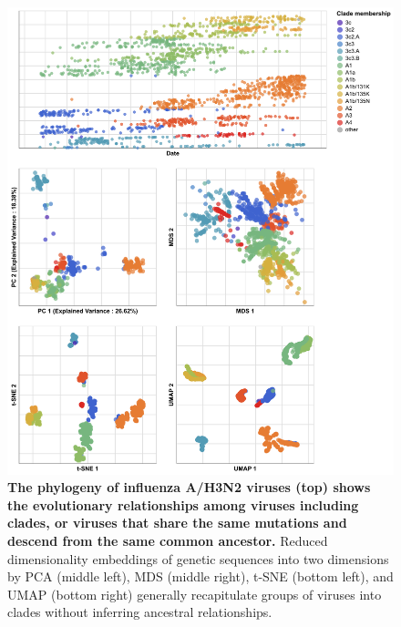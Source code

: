 \documentclass[10pt,letterpaper]{article}
\begin{document}

\begin{figure}[!h]
\includegraphics[width=\columnwidth]{figures/flu-2016-2018-ha-embeddings-by-clade.png}
\caption{{\bf The phylogeny of influenza A/H3N2 viruses (top) shows the evolutionary relationships among viruses including clades, or viruses that share the same mutations and descend from the same common ancestor.}
Reduced dimensionality embeddings of genetic sequences into two dimensions by PCA (middle left), MDS (middle right), t-SNE (bottom left), and UMAP (bottom right) generally recapitulate groups of viruses into clades without inferring ancestral relationships.}
\label{fig:seasonal-influenza-h3n2-ha-embeddings}
\end{figure}
\end{document}
